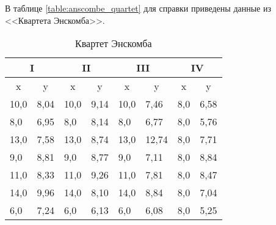 	В таблице \ref{table:anscombe_quartet} для справки приведены данные из 
	<<Квартета Энскомба>>.

    \begin{table}[!htp]
    	\centering
    	\caption{Квартет Энскомба}
		\begin{tabular}{|ll|ll|ll|ll|}
			\hline
			\multicolumn{2}{|c|}{I}                             & \multicolumn{2}{c|}{II}                            & \multicolumn{2}{c|}{III}                           & \multicolumn{2}{c|}{IV}                            \\ \hline
			\multicolumn{1}{|c|}{x}    & \multicolumn{1}{c|}{y} & \multicolumn{1}{c|}{x}    & \multicolumn{1}{c|}{y} & \multicolumn{1}{c|}{x}    & \multicolumn{1}{c|}{y} & \multicolumn{1}{c|}{x}    & \multicolumn{1}{c|}{y} \\ \hline
			\multicolumn{1}{|l|}{10,0} & 8,04                   & \multicolumn{1}{l|}{10,0} & 9,14                   & \multicolumn{1}{l|}{10,0} & 7,46                   & \multicolumn{1}{l|}{8,0}  & 6,58                   \\ \hline
			\multicolumn{1}{|l|}{8,0}  & 6,95                   & \multicolumn{1}{l|}{8,0}  & 8,14                   & \multicolumn{1}{l|}{8,0}  & 6,77                   & \multicolumn{1}{l|}{8,0}  & 5,76                   \\ \hline
			\multicolumn{1}{|l|}{13,0} & 7,58                   & \multicolumn{1}{l|}{13,0} & 8,74                   & \multicolumn{1}{l|}{13,0} & 12,74                  & \multicolumn{1}{l|}{8,0}  & 7,71                   \\ \hline
			\multicolumn{1}{|l|}{9,0}  & 8,81                   & \multicolumn{1}{l|}{9,0}  & 8,77                   & \multicolumn{1}{l|}{9,0}  & 7,11                   & \multicolumn{1}{l|}{8,0}  & 8,84                   \\ \hline
			\multicolumn{1}{|l|}{11,0} & 8,33                   & \multicolumn{1}{l|}{11,0} & 9,26                   & \multicolumn{1}{l|}{11,0} & 7,81                   & \multicolumn{1}{l|}{8,0}  & 8,47                   \\ \hline
			\multicolumn{1}{|l|}{14,0} & 9,96                   & \multicolumn{1}{l|}{14,0} & 8,10                   & \multicolumn{1}{l|}{14,0} & 8,84                   & \multicolumn{1}{l|}{8,0}  & 7,04                   \\ \hline
			\multicolumn{1}{|l|}{6,0}  & 7,24                   & \multicolumn{1}{l|}{6,0}  & 6,13                   & \multicolumn{1}{l|}{6,0}  & 6,08                   & \multicolumn{1}{l|}{8,0}  & 5,25                   \\ \hline

\end{tabular}
\end{table}
